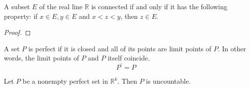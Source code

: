   \begin{theorem}[Connectedness]
    A subset $E$ of the real line $\mathbb{R}$ is connected if and only if it has the following property: if $x \in E, y \in E$ and $x < z < y$, then $z \in E$. 
  \end{theorem}
  \begin{proof}

  \end{proof}

  \begin{definition}
    A set $P$ is perfect if it is closed and all of its points are limit points of $P$. In other words, the limit points of $P$ and $P$ itself coincide. 
    \begin{equation}
      P^\prime = P
    \end{equation}
  \end{definition}

  \begin{theorem}
    Let $P$ be a nonempty perfect set in $\mathbb{R}^k$. Then $P$ is uncountable. 
  \end{theorem}

